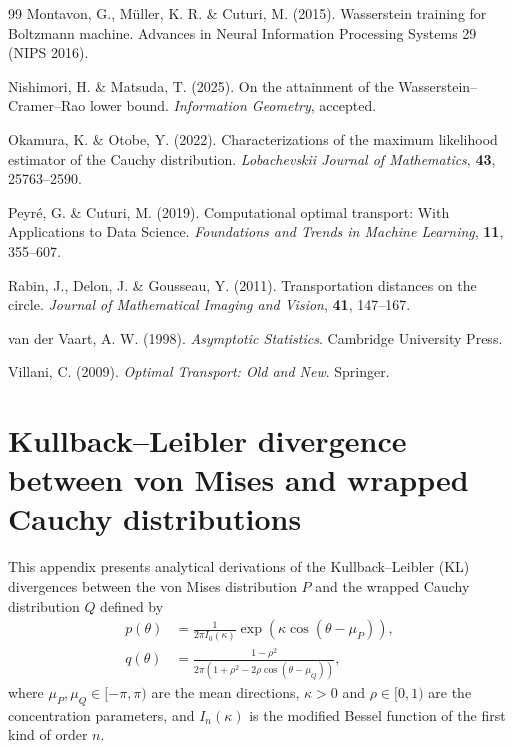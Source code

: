 \documentclass[11pt, a4paper]{article}
\begin{document}
\begin{thebibliography}{99}
Montavon, G., M\"{u}ller, K. R. \& Cuturi, M. (2015). 
Wasserstein training for Boltzmann machine. 
Advances in Neural Information Processing Systems 29 (NIPS 2016).

Nishimori, H. \& Matsuda, T. (2025).
On the attainment of the Wasserstein--Cramer--Rao lower bound.
\textit{Information Geometry}, accepted.

Okamura, K. \& Otobe, Y. (2022).
Characterizations of the maximum likelihood estimator of the Cauchy distribution. 
\textit{Lobachevskii Journal of Mathematics}, \textbf{43}, 25763--2590.

Peyr\'{e}, G. \& Cuturi, M. (2019).
Computational optimal transport: With Applications to Data Science.
\textit{Foundations and Trends{\textregistered} in Machine Learning}, \textbf{11}, 355--607.

Rabin, J., Delon, J. \& Gousseau, Y. (2011).
Transportation distances on the circle.
\textit{Journal of Mathematical Imaging and Vision}, \textbf{41}, 147--167.

van der Vaart, A. W. (1998). 
\textit{Asymptotic Statistics}. 
Cambridge University Press.

Villani, C. (2009). 
\textit{Optimal Transport: Old and New}. 
Springer.
\end{thebibliography}

\appendix

\section{Kullback--Leibler divergence between von Mises and wrapped Cauchy distributions}
This appendix presents analytical derivations of the Kullback--Leibler (KL) divergences between the von Mises distribution $P$ and the wrapped Cauchy distribution $Q$ defined by
\begin{align*}
	p(\theta) &= \frac{1}{2\pi I_0(\kappa)} \exp(\kappa \cos(\theta - \mu_P)), \\
	q(\theta) &= \frac{1 - \rho^2}{2\pi (1 + \rho^2 - 2\rho \cos(\theta - \mu_Q))},
\end{align*}
where $\mu_P, \mu_Q \in [-\pi, \pi)$ are the mean directions, $\kappa > 0$ and $\rho \in [0, 1)$ are the concentration parameters, and $I_n(\kappa)$ is the modified Bessel function of the first kind of order $n$.
\end{document}
